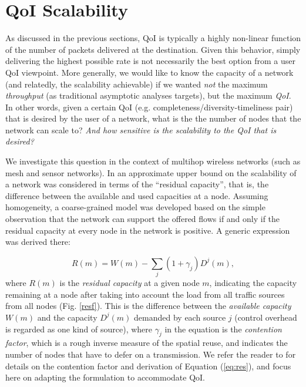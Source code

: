 
\section{QoI Scalability}
\label{sec:qoi_scalability}

As discussed in the previous sections, QoI %
is typically a highly
non-linear function of the number of packets delivered at the
destination. Given this behavior, simply
delivering the highest possible rate is not necessarily the best
option from a user QoI viewpoint. More generally, we would like to know
the capacity of a network (and relatedly, the scalability achievable)
if we wanted {\em not} the maximum {\em throughput} (as traditional
asymptotic analyses targets), but the maximum {\em QoI}. In other
words, given a certain QoI (e.g. completeness/diversity-timeliness pair) that is desired by the  user of a network,
what is the the number of nodes that the network can scale to?\emph{ And how
sensitive is the scalability to the QoI that is desired?}

We investigate this question in the context of multihop wireless networks
(such as mesh and sensor networks).
In \cite{scalability_manets_theory_vs_practice} an approximate upper bound on the
 scalability of a network was
considered in terms of the ``residual capacity'', that is, the difference
between the available and used capacities at a node. Assuming homogeneity, a
coarse-grained model was developed based on the simple observation
that the network can support the offered flows if and only if the
residual capacity at every node in the network is positive.  A generic
expression was derived there:


\begin{equation}
R(m) = W(m) - \sum_j (1+\gamma_j)D^j(m),
\label{eq:res}
\end{equation}
where $R(m)$ is the {\em residual capacity} at a given node $m$, indicating
the capacity remaining at a node after taking into account the load
from all traffic sources from all nodes (Fig. \ref{resf}). This is the difference
between the {\em available capacity} $W(m)$  and the capacity $D^j(m)$
demanded by
each source $j$ (control overhead is regarded as one kind of
source), where $\gamma_j$ in the equation is the {\em contention factor}, which is a rough inverse
measure of the spatial reuse, and indicates the number of  nodes that have
to defer on a transmission.
We refer the reader to \cite{scalability_manets_theory_vs_practice} for details on the contention factor
and derivation of Equation (\ref{eq:res}), and focus here on adapting the
formulation to accommodate QoI.

